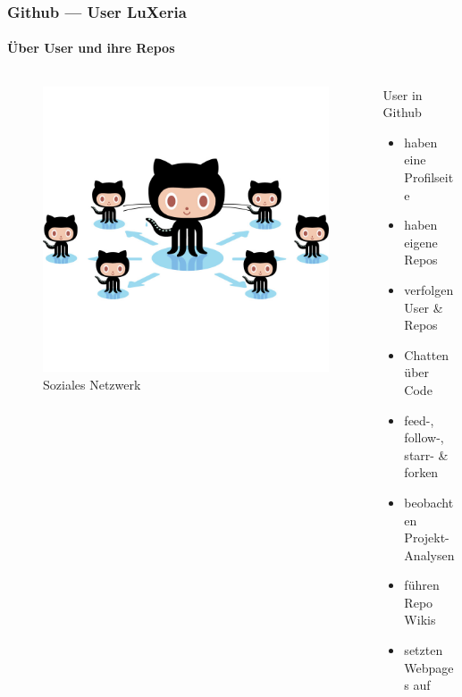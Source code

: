 \begin{frame}
	\frametitle{Github --- User \hfill{} LuXeria}
	\framesubtitle{Über User und ihre Repos}
	\begin{columns}
		\begin{column}{5cm}
			\begin{figure}
			\includegraphics[scale=0.15]{github_social.jpg}
			\caption{Soziales Netzwerk}
			\end{figure}
		\end{column}
		\begin{column}{5cm}
			\begin{block}{User in Github}
				\begin{itemize}
					\item haben eine Profilseite
					\item haben eigene Repos
					\item verfolgen User \& Repos
					\item Chatten über Code
					\item feed-, follow-,  starr- \& forken
					\item beobachten Projekt-Analysen
					\item führen Repo Wikis
					\item setzten Webpages auf
				\end{itemize}
			\end{block}
		\end{column}
	\end{columns}
\end{frame}

